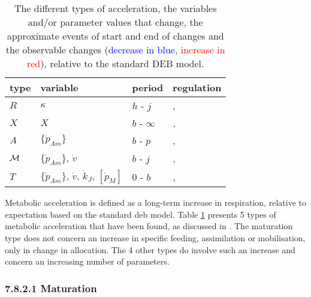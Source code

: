 \begin{table}
\caption[]{\protect\small\label{tab:acceleration}
  The different types of acceleration, the variables and/or parameter values that change, the approximate events of start and end of changes and the observable changes (\textcolor{blue}{decrease in blue}, \textcolor{red}{increase in red}), relative to the standard DEB model.}
\begin{center}
\begin{tabular}{llll} \hline
type & variable & period & regulation \\ \hline
$R$  & $\kappa$ & 
   $h$ - $j$ &      
   \color{red}{$\dot{J}_O$, $\frac{d} {dt} E_H$}, 
   \color{blue}{$\frac{d} {dt} W$, $a_b$, $a_j$, $a_p$, $W_j$, $W_p$} \\
$X$  & $X$ & 
   $b$ - $\infty$ & 
   \color{red}{$\dot{J}_O$, $\dot{R}_m$, $\frac{d} {dt} W$, $W_j$, $W_p$, $W/ L^3$}, 
   \color{blue}{$a_j$, $a_p$} \\
$A$  & $\{\dot{p}_{Am}\}$ & 
   $b$ - $p$ &      
   \color{red}{$\dot{J}_O$, $\dot{R}_m$, $\frac{d} {dt} W$, $W_j$, $W_p$, $W/ L^3$}, 
   \color{blue}{$a_j$, $a_p$} \\
$\cal M$ & $\{\dot{p}_{Am}\}$, $\dot{v}$ & 
   $b$ - $j$ & 
   \color{red}{$\dot{J}_O$, $\dot{R}_m$, $\frac{d} {dt} W$, $W_j$, $W_p$}, 
   \color{blue}{$a_b$, $a_j$, $a_p$} \\
$T$  & $\{\dot{p}_{Am}\}$, $\dot{v}$, $\dot{k}_J$, $[\dot{p}_M]$ & 
   $0$ - $b$ & 
   \color{red}{$\dot{J}_O$, $\dot{R}_m$, $\frac{d} {dt} W$}, 
	 \color{blue}{$a_b$, $a_j$, $a_p$} \\
\hline
\end{tabular}
\end{center}
\end{table}

Metabolic acceleration is defined as a long-term increase in respiration, relative to expectation based on the standard {\sc deb} model.
Table \ref{tab:acceleration} presents 5 types of metabolic acceleration that have been found, as discussed in \cite{Kooy2013b}.
The maturation type does not concern an increase in specific feeding, assimilation or mobilisation, only in change in allocation.
The 4 other types do involve such an increase and concern an increasing number of parameters.

\subsubsection*{7.8.2.1 Maturation}
{}
\label{sssec_c:acceleration_J}

